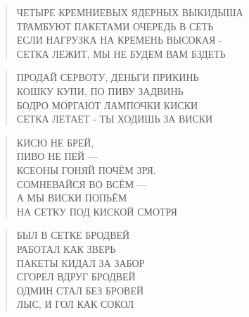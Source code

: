 \poemtitle{***}
\begin{verse}
ЧЕТЫРЕ КРЕМНИЕВЫХ ЯДЕРНЫХ ВЫКИДЫША\\
ТРАМБУЮТ ПАКЕТАМИ ОЧЕРЕДЬ В СЕТЬ\\
ЕСЛИ НАГРУЗКА НА КРЕМЕНЬ ВЫСОКАЯ -\\
СЕТКА ЛЕЖИТ, МЫ НЕ БУДЕМ ВАМ БЗДЕТЬ
\end{verse}

\poemtitle{***}
\begin{verse}
ПРОДАЙ СЕРВОТУ, ДЕНЬГИ ПРИКИНЬ\\
КОШКУ КУПИ, ПО ПИВУ ЗАДВИНЬ\\
БОДРО МОРГАЮТ ЛАМПОЧКИ КИСКИ\\
СЕТКА ЛЕТАЕТ - ТЫ ХОДИШЬ ЗА ВИСКИ
\end{verse}

\poemtitle{***}
\begin{verse}
КИСЮ НЕ БРЕЙ, \\
ПИВО НЕ ПЕЙ —\\
КСЕОНЫ ГОНЯЙ ПОЧЁМ ЗРЯ.\\
СОМНЕВАЙСЯ ВО ВСЁМ —\\
А МЫ ВИСКИ ПОПЬЁМ\\
НА СЕТКУ ПОД КИСКОЙ СМОТРЯ
\end{verse}

\poemtitle{***}
\begin{verse}
БЫЛ В СЕТКЕ БРОДВЕЙ\\
РАБОТАЛ КАК ЗВЕРЬ\\
ПАКЕТЫ КИДАЛ ЗА ЗАБОР\\
СГОРЕЛ ВДРУГ БРОДВЕЙ\\
ОДМИН СТАЛ БЕЗ БРОВЕЙ\\
ЛЫС, И ГОЛ КАК СОКОЛ
\end{verse}


